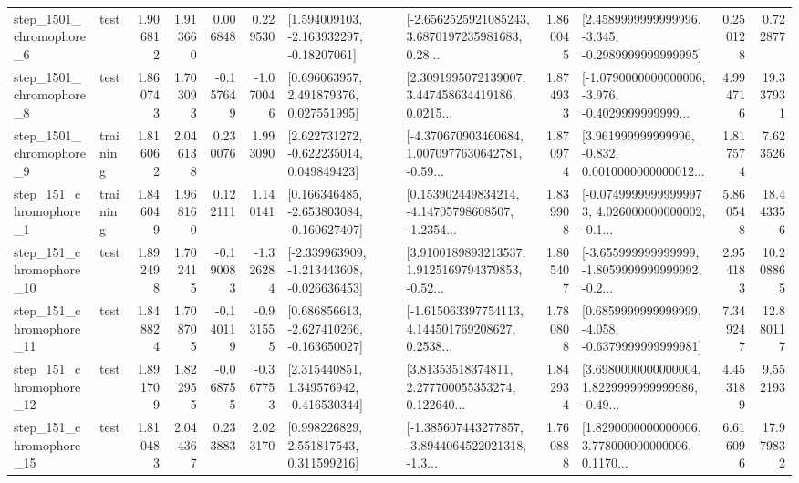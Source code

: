 \begin{tabular}{llrrrrllrlrr}
  step\_1501\_chromophore\_6 &      test &      1.906812 &    1.913660 &      0.006848 &  0.229530 &    [1.594009103, -2.163932297, -0.18207061] &  [-2.6562525921085243, 3.6870197235981683, 0.28... &       1.860045 &  [2.4589999999999996, -3.345, -0.2989999999999995] &            0.250128 &          0.722877 \\
  step\_1501\_chromophore\_8 &      test &      1.860743 &    1.703093 &     -0.157649 & -1.070046 &     [0.696063957, 2.491879376, 0.027551995] &  [2.3091995072139007, 3.447458634419186, 0.0215... &       1.874933 &  [-1.0790000000000006, -3.976, -0.4029999999999... &            4.994716 &         19.337931 \\
  step\_1501\_chromophore\_9 &  training &      1.816062 &    2.046138 &      0.230076 &  1.993090 &    [2.622731272, -0.622235014, 0.049849423] &  [-4.370670903460684, 1.0070977630642781, -0.59... &       1.870974 &  [3.961999999999996, -0.832, 0.0010000000000012... &            1.817574 &          7.623526 \\
   step\_151\_chromophore\_1 &  training &      1.846049 &    1.968160 &      0.122111 &  1.140141 &   [0.166346485, -2.653803084, -0.160627407] &  [0.153902449834214, -4.14705798608507, -1.2354... &       1.839908 &  [-0.07499999999999973, 4.026000000000002, -0.1... &            5.860548 &         18.443356 \\
  step\_151\_chromophore\_10 &      test &      1.892498 &    1.702415 &     -0.190083 & -1.326284 &  [-2.339963909, -1.213443608, -0.026636453] &  [3.9100189893213537, 1.9125169794379853, -0.52... &       1.805407 &  [-3.655999999999999, -1.8059999999999992, -0.2... &            2.954183 &         10.208865 \\
  step\_151\_chromophore\_11 &      test &      1.848824 &    1.708705 &     -0.140119 & -0.931555 &   [0.686856613, -2.627410266, -0.163650027] &  [-1.615063397754113, 4.144501769208627, 0.2538... &       1.780808 &  [0.6859999999999999, -4.058, -0.6379999999999981] &            7.349247 &         12.880117 \\
  step\_151\_chromophore\_12 &      test &      1.891709 &    1.822955 &     -0.068755 & -0.367753 &    [2.315440851, 1.349576942, -0.416530344] &  [3.81353518374811, 2.277700055353274, 0.122640... &       1.842934 &  [3.6980000000000004, 1.8229999999999986, -0.49... &            4.453189 &          9.552193 \\
  step\_151\_chromophore\_15 &      test &      1.810483 &    2.044367 &      0.233883 &  2.023170 &     [0.998226829, 2.551817543, 0.311599216] &  [-1.385607443277857, -3.8944064522021318, -1.3... &       1.760888 &  [1.8290000000000006, 3.778000000000006, 0.1170... &            6.616096 &         17.979832 \\

\end{tabular}
